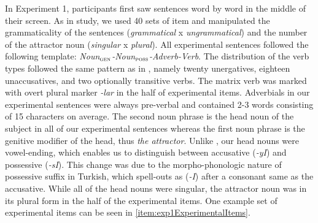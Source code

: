 \documentclass[doc,a4paper,man,natbib,floatsintext,noextraspace]{apa6}\usepackage[]{graphicx}\usepackage[]{color}
\begin{document}
In Experiment 1, participants first saw sentences word by word in the middle of their screen. As in \citet{LagoEtAl:2018} study, we used 40 sets of item and manipulated the grammaticality of the sentences (\textit{grammatical} x \textit{ungrammatical}) and the number of the attractor noun (\textit{singular} x \textit{plural}). All experimental sentences followed the following template: \textit{Noun$_{{\textsc{gen}}}$-Noun$_{{\textsc{poss}}}$-Adverb-Verb}. The distribution of the verb types followed the same pattern as in \citet{LagoEtAl:2018}, namely twenty unergatives, eighteen unaccusatives, and two optionally transitive verbs. The matrix verb was marked with overt plural marker \textit{-lar} in the half of experimental items. Adverbials in our experimental sentences were always pre-verbal and contained 2-3 words consisting of 15 characters on average. The second noun phrase is the head noun of the subject in all of our experimental sentences whereas the first noun phrase is the genitive modifier of the head, thus \textit{the attractor}. Unlike \citet{LagoEtAl:2018}, our head nouns were vowel-ending, which enables us to distinguish between accusative (\textit{-yI}) and possessive (\textit{-sI}). This change was due to the morpho-phonologic nature of possessive suffix in Turkish, which spell-outs as (\textit{-I}) after a consonant same as the accusative. While all of the head nouns were singular, the attractor noun was in its plural form in the half of the experimental items. One example set of experimental items can be seen in \ref{item:exp1ExperimentalItems}.
\end{document}
